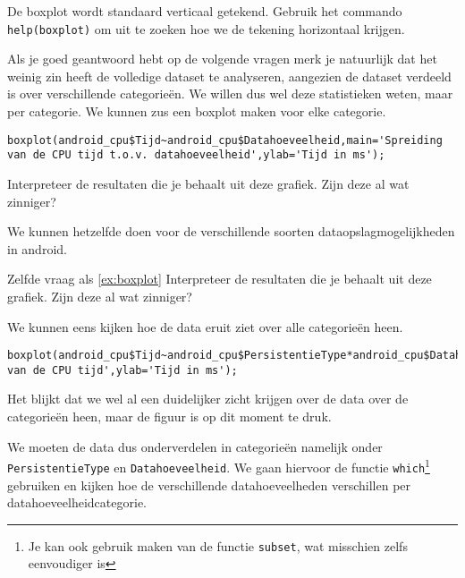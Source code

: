 \begin{exercise}
	De boxplot wordt standaard verticaal getekend. Gebruik het commando \texttt{help(boxplot)} om uit te zoeken hoe we de tekening horizontaal krijgen. 
\end{exercise}

Als je goed geantwoord hebt op de volgende vragen merk je natuurlijk dat het weinig zin heeft de volledige dataset te analyseren, aangezien de dataset verdeeld is over verschillende categorie\"en. We willen dus wel deze statistieken weten, maar per categorie. We kunnen zus een boxplot maken voor elke categorie.

\begin{lstlisting}
boxplot(android_cpu$Tijd~android_cpu$Datahoeveelheid,main='Spreiding van de CPU tijd t.o.v. datahoeveelheid',ylab='Tijd in ms');
\end{lstlisting}

\begin{exercise}
	\label{ex:boxplot}
	Interpreteer de resultaten die je behaalt uit deze grafiek. Zijn deze al wat zinniger?
\end{exercise}

We kunnen hetzelfde doen voor de verschillende soorten dataopslagmogelijkheden in android.

\begin{exercise}
	Zelfde vraag als \ref{ex:boxplot} Interpreteer de resultaten die je behaalt uit deze grafiek. Zijn deze al wat zinniger?
\end{exercise}

We kunnen eens kijken hoe de data eruit ziet over alle categorie\"en heen.

\begin{lstlisting}
boxplot(android_cpu$Tijd~android_cpu$PersistentieType*android_cpu$Datahoeveelheid,main='Spreiding van de CPU tijd',ylab='Tijd in ms');
\end{lstlisting}

Het blijkt dat we wel al een duidelijker zicht krijgen over de data over de categorie\"en heen, maar de figuur is op dit moment te druk. 

We moeten de data dus onderverdelen in categorie\"en namelijk onder \texttt{PersistentieType} en \texttt{Datahoeveelheid}. We gaan hiervoor de functie \texttt{which}\footnote{Je kan ook gebruik maken van de functie \texttt{subset}, wat misschien zelfs eenvoudiger is} gebruiken en kijken hoe de verschillende datahoeveelheden verschillen per datahoeveelheidcategorie. 

